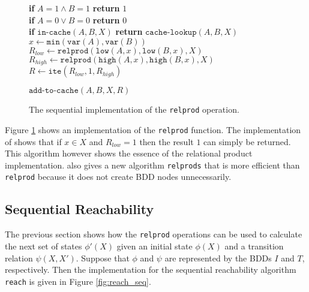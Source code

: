 \begin{figure}
	\centering
	\begin{algorithm}[H]
		\SetStartEndCondition{ }{}{}%
		\AlgoDontDisplayBlockMarkers\SetAlgoNoEnd\SetAlgoNoLine%

		 {
			\textbf{if} $A=1 \wedge B=1$ \textbf{return} $1$ \\
			\textbf{if} $A=0 \vee B=0$ \textbf{return} $0$ \\
			\textbf{if} $\texttt{in-cache}(A, B, X)$ \textbf{return} $\texttt{cache-lookup}(A, B, X)$ \\
			$x \gets \texttt{min}(\texttt{var}(A), \texttt{var}(B))$ \\
			$R_{low} \gets \texttt{relprod}(\texttt{low}(A, x), \texttt{low}(B, x), X)$ \\
			$R_{high} \gets \texttt{relprod}(\texttt{high}(A, x), \texttt{high}(B, x), X)$ \\

			 {
				$R \gets \texttt{ite}(R_{low}, 1, R_{high})$
			}
			
			$\texttt{add-to-cache}(A, B, X, R)$ \\
		}
	\end{algorithm}

	\caption{The sequential implementation of the \texttt{relprod} operation.}
	\label{fig:relprod_seq}
\end{figure}

Figure \ref{fig:relprod_seq} shows an implementation of the \texttt{relprod} function. The implementation of \cite{dijk2012parallelization} shows that if $x \in X$ and $R_{low} = 1$ then the result $1$ can simply be returned. This algorithm however shows the essence of the relational product implementation. \cite{dijk2012parallelization} also gives a new algorithm \texttt{relprods} that is more efficient than \texttt{relprod} because it does not create BDD nodes unnecessarily.

\subsection{Sequential Reachability}
The previous section shows how the \texttt{relprod} operations can be used to calculate the next set of states $\phi'(X)$ given an initial state $\phi(X)$ and a transition relation $\psi(X, X')$. Suppose that $\phi$ and $\psi$ are represented by the BDDs $I$ and $T$, respectively. Then the implementation for the sequential reachability algorithm \texttt{reach} is given in Figure \ref{fig:reach_seq}.

